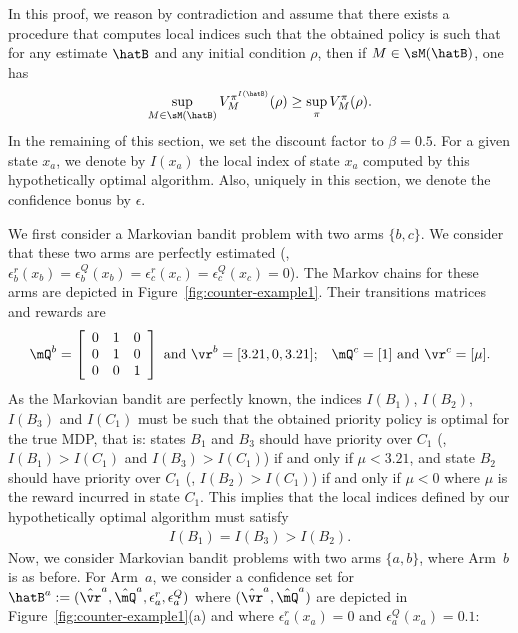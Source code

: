 In this proof, we reason by contradiction and assume that there exists a procedure that computes local indices such that the obtained policy is such that for any estimate $\hatB$ and any initial condition $\rho$, then if $M\in\sM(\hatB)$, one has 
\begin{align}
    \sup_{M\in\sM(\hatB)}V^{\pi^{I(\hatB)}}_{M}(\rho) \ge \sup_{\pi} V^\pi_{M}(\rho).
\end{align}
In the remaining of this section, we set the discount factor to $\beta=0.5$. For a given state $x_a$, we denote by $I(x_a)$ the local index of state $x_a$ computed by this hypothetically optimal algorithm.
Also, uniquely in this section, we denote the confidence bonus by $\epsilon$.

We first consider a Markovian bandit problem with two arms $\{b,c\}$. We consider that these two arms are perfectly estimated (\ie, $\epsilon^r_b(x_b)=\epsilon^Q_b(x_b)=\epsilon^r_c(x_c)=\epsilon^Q_c(x_c)=0$). The Markov chains for these arms are depicted in Figure~\ref{fig:counter-example1}. Their transitions matrices and rewards are
\begin{align*}
    \mQ^b = \left[\begin{array}{ccc}
        0 & 1 & 0\\
        0 & 1 & 0\\
        0 & 0 & 1
    \end{array}\right]
    \text{ and } \vr^b = [3.21,0,3.21];
    && \mQ^c = [1] \text{ and } \vr^c = [\mu].
\end{align*}
As the Markovian bandit are perfectly known, the indices $I(B_1)$, $I(B_2)$, $I(B_3)$ and $I(C_1)$ must be such that the obtained priority policy is optimal for the true MDP, that is: states $B_1$ and $B_3$ should have priority over $C_1$ (\ie, $I(B_1)>I(C_1)$ and $I(B_3)>I(C_1)$) if and only if $\mu<3.21$, and state $B_2$ should have priority over $C_1$ (\ie, $I(B_2)>I(C_1)$) if and only if $\mu<0$ where $\mu$ is the reward incurred in state $C_1$. This implies that the local indices defined by our hypothetically optimal algorithm must satisfy
\begin{align*}
    I(B_1) = I(B_3) > I(B_2).
\end{align*}
Now, we consider Markovian bandit problems with two arms $\{a,b\}$, where Arm~$b$ is as before. For Arm~$a$, we consider a confidence set for $\hatB^a:=(\hat{\vr}^a,\hat{\mQ}^a,\epsilon^r_a,\epsilon^Q_a)$
where $(\hat{\vr}^a,\hat{\mQ}^a)$ are depicted in Figure~\ref{fig:counter-example1}(a) and where $\epsilon^r_a(x_a)=0$ and $\epsilon^Q_a(x_a)=0.1$:

